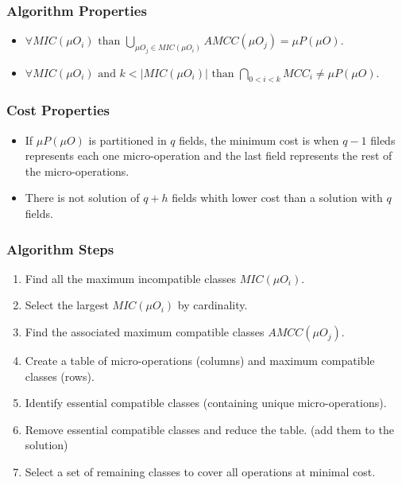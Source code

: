 \begin{frame}
    \frametitle{Algorithm Properties}
    \begin{itemize}
        \item $\forall MIC(\mu O_{i}) \text{ than } \bigcup_{\mu O_{j} \in MIC(\mu O_{i})} AMCC(\mu O_{j}) = \mu P(\mu O)$.
        \item $\forall MIC(\mu O_{i}) \text{ and } k < |MIC(\mu O_{i}) | \text{ than } \bigcap_{0 < i < k} MCC_{i} \neq \mu P(\mu O)$.
    \end{itemize}
\end{frame}

\begin{frame}
    \frametitle{Cost Properties}
    \begin{itemize}
        \item If $\mu P(\mu O)$ is partitioned in $q$ fields, the minimum cost is when $q-1$ fileds represents each one micro-operation and the last field represents the rest of the micro-operations.
        \item There is not solution of $q+h$ fields whith lower cost than a solution with $q$ fields.
    \end{itemize}
\end{frame}

\begin{frame}
    \frametitle{Algorithm Steps}
    \begin{enumerate}
        \item Find all the maximum incompatible classes $MIC(\mu O_{i})$.
        \item Select the largest $MIC(\mu O_{i})$ by cardinality.
        \item Find the associated maximum compatible classes $AMCC(\mu O_{j})$.
        \item Create a table of micro-operations (columns) and maximum compatible classes (rows).
        \item Identify essential compatible classes (containing unique micro-operations).
        \item Remove essential compatible classes and reduce the table. (add them to the solution)
        \item Select a set of remaining classes to cover all operations at minimal cost.
    \end{enumerate}
\end{frame}

